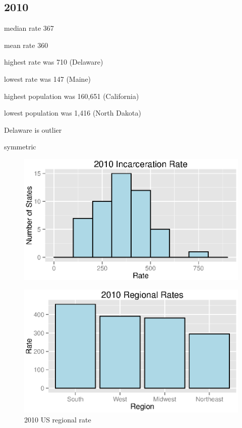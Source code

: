\documentclass{exam}
\begin{document}
  \subsection{2010}
  \begin{itemize*}
    \item median rate 367
    \item mean rate 360
    \item highest rate was 710 (Delaware)
    \item lowest rate was 147 (Maine)
    \item highest population was 160,651 (California)
    \item lowest population was 1,416 (North Dakota)
    \item Delaware is outlier
    \item symmetric
  \end{itemize*}

  \begin{figure}[H]
    \centering
    \includegraphics[scale = 0.9]{figures/rate_histogram_2010.eps}
  \end{figure}

  \begin{figure}[H]
    \centering
    \includegraphics[scale = 0.9]{figures/regional_rates_2010.eps}
    \caption{2010 US regional rate}
  \end{figure}
\end{document}
